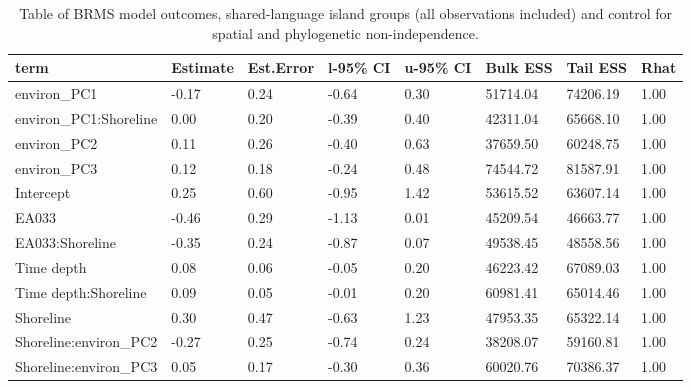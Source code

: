 \begin{table}[ht]
\centering
\begin{tabular}{p{3cm}p{1.35cm}p{1.35cm}p{1.35cm}p{1.35cm}p{1.35cm}p{1.35cm}p{1.35cm}}
  \toprule
term & Estimate & Est.Error & l-95\% CI & u-95\% CI & Bulk ESS & Tail ESS & Rhat \\ 
  \midrule
environ\_PC1 & -0.17 & 0.24 & -0.64 & 0.30 & 51714.04 & 74206.19 & 1.00 \\ 
  environ\_PC1:Shoreline & 0.00 & 0.20 & -0.39 & 0.40 & 42311.04 & 65668.10 & 1.00 \\ 
  environ\_PC2 & 0.11 & 0.26 & -0.40 & 0.63 & 37659.50 & 60248.75 & 1.00 \\ 
  environ\_PC3 & 0.12 & 0.18 & -0.24 & 0.48 & 74544.72 & 81587.91 & 1.00 \\ 
  Intercept & 0.25 & 0.60 & -0.95 & 1.42 & 53615.52 & 63607.14 & 1.00 \\ 
  EA033 & -0.46 & 0.29 & -1.13 & 0.01 & 45209.54 & 46663.77 & 1.00 \\ 
  EA033:Shoreline & -0.35 & 0.24 & -0.87 & 0.07 & 49538.45 & 48558.56 & 1.00 \\ 
  Time depth & 0.08 & 0.06 & -0.05 & 0.20 & 46223.42 & 67089.03 & 1.00 \\ 
  Time depth:Shoreline & 0.09 & 0.05 & -0.01 & 0.20 & 60981.41 & 65014.46 & 1.00 \\ 
  Shoreline & 0.30 & 0.47 & -0.63 & 1.23 & 47953.35 & 65322.14 & 1.00 \\ 
  Shoreline:environ\_PC2 & -0.27 & 0.25 & -0.74 & 0.24 & 38208.07 & 59160.81 & 1.00 \\ 
  Shoreline:environ\_PC3 & 0.05 & 0.17 & -0.30 & 0.36 & 60020.76 & 70386.37 & 1.00 \\ 
   \bottomrule
\end{tabular}
\caption{Table of BRMS model outcomes, shared-language island groups (all observations included) and control for spatial and phylogenetic non-independence.} 
\label{BRMS_effects_medium_control_sp}
\end{table}
